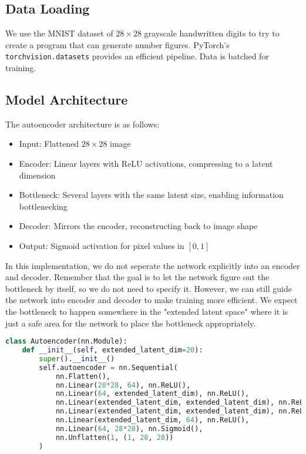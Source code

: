 \documentclass[12pt]{article}
\begin{document}
\subsection{Data Loading}
We use the MNIST dataset of $28\times 28$ grayscale handwritten digits to try to create a program that can generate number figures. PyTorch's \texttt{torchvision.datasets} provides an efficient pipeline. Data is batched for training.

\subsection{Model Architecture}
The autoencoder architecture is as follows:
\begin{itemize}
    \item Input: Flattened $28\times 28$ image
    \item Encoder: Linear layers with ReLU activations, compressing to a latent dimension
    \item Bottleneck: Several layers with the same latent size, enabling information bottlenecking
    \item Decoder: Mirrors the encoder, reconstructing back to image shape
    \item Output: Sigmoid activation for pixel values in $[0,1]$
\end{itemize}

In this implementation, we do not seperate the network explicitly into an encoder and decoder. Remember that the goal is to let the network figure out the bottleneck by itself, so we do not need to specify it. However, we can still guide the network into encoder and decoder to make training more efficient. We expect the bottleneck to happen somewhere in the "extended latent space" where it is just a safe area for the network to place the bottleneck appropriately.

\begin{lstlisting}[language=Python,caption={Autoencoder Definition}]
class Autoencoder(nn.Module):
    def __init__(self, extended_latent_dim=20):
        super().__init__()
        self.autoencoder = nn.Sequential(
            nn.Flatten(),
            nn.Linear(28*28, 64), nn.ReLU(),
            nn.Linear(64, extended_latent_dim), nn.ReLU(),
            nn.Linear(extended_latent_dim, extended_latent_dim), nn.ReLU(),
            nn.Linear(extended_latent_dim, extended_latent_dim), nn.ReLU(),
            nn.Linear(extended_latent_dim, 64), nn.ReLU(),
            nn.Linear(64, 28*28), nn.Sigmoid(),
            nn.Unflatten(1, (1, 28, 28))
        )
\end{lstlisting}
\end{document}
